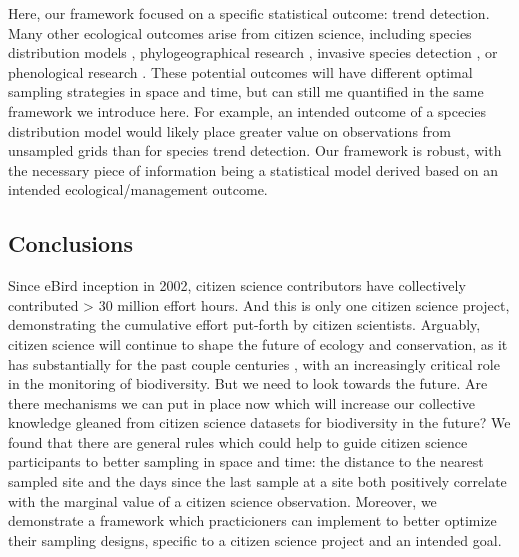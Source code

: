 \documentclass[9pt,twocolumn,twoside,lineno]{pnas-new}
\begin{document}
Here, our framework focused on a specific statistical outcome: trend detection. Many other ecological outcomes arise from citizen science, including species distribution models \cite{bradsworth2017species, van2013opportunistic}, phylogeographical research \cite{bahls2014new, drury2019continent}, invasive species detection \cite{pocock2017citizen, grason2018citizen}, or phenological research \cite{la2014role, supp2015citizen}. These potential outcomes will have different optimal sampling strategies in space and time, but can still me quantified in the same framework we introduce here. For example, an intended outcome of a spcecies distribution model would likely place greater value on observations from unsampled grids \cite{crawley2001scale} than for species trend detection. Our framework is robust, with the necessary piece of information being a statistical model derived based on an intended ecological/management outcome.

\subsection*{Conclusions}
Since eBird inception in 2002, citizen science contributors have collectively contributed > 30 million effort hours. And this is only one citizen science project, demonstrating the cumulative effort put-forth by citizen scientists. Arguably, citizen science will continue to shape the future of ecology and conservation, as it has substantially for the past couple centuries \cite{silvertown2009new}, with an increasingly critical role \cite{mckinley2017citizen, pocock2018vision} in the monitoring of biodiversity. But we need to look towards the future. Are there mechanisms we can put in place now which will increase our collective knowledge gleaned from citizen science datasets for biodiversity in the future? We found that there are general rules which could help to guide citizen science participants to better sampling in space and time: the distance to the nearest sampled site and the days since the last sample at a site both positively correlate with the marginal value of a citizen science observation. Moreover, we demonstrate a framework which practicioners can implement to better optimize their sampling designs, specific to a citizen science project and an intended goal.
\end{document}
